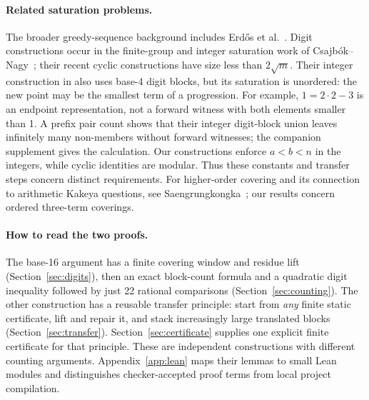 \documentclass[11pt]{article}
\theoremstyle{definition}\newtheorem{definition}[theorem]{Definition}
\theoremstyle{remark}\newtheorem{remark}[theorem]{Remark}
\numberwithin{equation}{section}
\begin{document}
\paragraph{Related saturation problems.}
The broader greedy-sequence background includes Erd\H{o}s et al.~\cite{ELRSS}.
Digit constructions occur in the finite-group and integer saturation work of
Csajb\'ok--Nagy~\cite{CN24,CN26}; their recent cyclic constructions have size
less than $2\sqrt m$. Their integer construction in
\cite[Theorem 4.13]{CN24} also uses base-4 digit blocks, but its saturation is
unordered: the new point may be the smallest term of a progression. For example,
$1=2\cdot2-3$ is an endpoint representation, not a forward witness with both
elements smaller than 1. A prefix pair count shows that their integer digit-block
union leaves infinitely many non-members without forward witnesses; the
companion supplement gives the calculation. Our constructions enforce $a<b<n$
in the integers, while cyclic identities are modular. Thus these constants and
transfer steps concern distinct requirements. For higher-order covering and its
connection to arithmetic Kakeya questions, see Saengrungkongka~\cite{Saeng};
our results concern ordered three-term coverings.

\paragraph{How to read the two proofs.}
The base-16 argument has a finite covering window and residue lift (Section~\ref{sec:digits}), then an exact block-count formula and a quadratic digit inequality followed by just 22 rational comparisons (Section~\ref{sec:counting}). The other construction has a reusable transfer principle: start from \emph{any} finite static certificate, lift and repair it, and stack increasingly large translated blocks (Section~\ref{sec:transfer}). Section~\ref{sec:certificate} supplies one explicit finite certificate for that principle. These are independent constructions with different counting arguments. Appendix~\ref{app:lean} maps their lemmas to small Lean modules and distinguishes checker-accepted proof terms from local project compilation.
\end{document}
